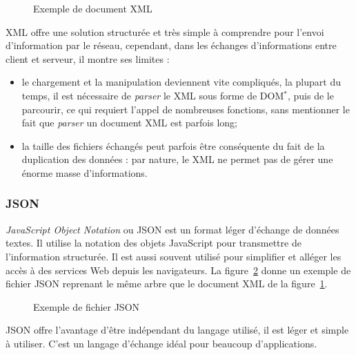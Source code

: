 \vspace{0.20cm}

\begin{figure}[!ht]
	
	\caption{Exemple de document XML}
	\label{code:exempleXML}

\end{figure}

XML offre une solution structur\'ee et tr\`es simple \`a comprendre pour l'envoi d'information par le r\'eseau, cependant, dans les \'echanges d'informations entre client et serveur, il montre ses limites :

\begin{itemize}
	\item le chargement et la manipulation deviennent vite compliqu\'es, la plupart du temps, il est n\'ecessaire de \textit{parser} le XML sous forme de DOM$^*$, puis de le parcourir, ce qui requiert l'appel de nombreuses fonctions, sans mentionner le fait que \textit{parser} un document XML est parfois long;
	\item la taille des fichiers \'echang\'es peut parfois \^etre cons\'equente du fait de la duplication des donn\'ees : par nature, le XML ne permet pas de g\'erer une \'enorme masse d'informations.

\end{itemize}

\subsubsection{JSON}

\textit{JavaScript Object Notation} ou JSON est un format l\'eger d'\'echange de donn\'ees textes.
Il utilise la notation des objets JavaScript pour transmettre de l'information structur\'ee.
Il est aussi souvent utilis\'e pour simplifier et all\'eger les acc\`es \`a des services Web depuis les navigateurs.
La figure~\ref{code:exempleJSON} donne un exemple de fichier JSON reprenant le m\^eme arbre que le document XML de la figure~\ref{code:exempleXML}.

\clearpage

\begin{figure}[!ht]
	
	\caption{Exemple de fichier JSON}
	\label{code:exempleJSON}

\end{figure}

JSON offre l'avantage d'\^etre ind\'ependant du langage utilis\'e, il est l\'eger et simple \`a utiliser.
C'est un langage d'\'echange id\'eal pour beaucoup d'applications.

